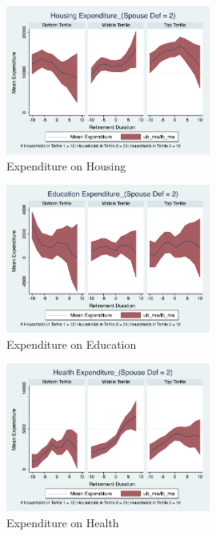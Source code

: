 \documentclass[11pt,onecolumn]{article}
\begin{document}
\clearpage

\begin{figure}[h]
	\caption{Expenditure on Housing}
	\centering
	\includegraphics[width=0.6\textwidth]{../ConsumptionPostRetirement_by_SpouseDef_Cats/Smoothed/2/spouse_def_total_housing_real.pdf}
\end{figure}


\begin{figure}[h]
	\caption{Expenditure on Education}
	\centering
	\includegraphics[width=0.6\textwidth]{../ConsumptionPostRetirement_by_SpouseDef_Cats/Smoothed/2/spouse_def_total_education_real.pdf}
\end{figure}
\clearpage

\begin{figure}[h]
	\caption{Expenditure on Health}
	\centering
	\includegraphics[width=0.6\textwidth]{../ConsumptionPostRetirement_by_SpouseDef_Cats/Smoothed/2/spouse_def_total_healthexpense_real.pdf}
\end{figure}
\end{document}
